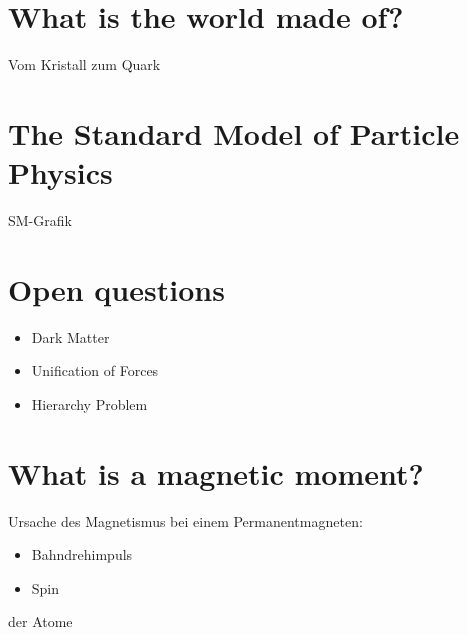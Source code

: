 \documentclass[12pt]{beamer}
\begin{document}

\section{What is the world made of?}

\begin{frame}{\insertsection}
  Vom Kristall zum Quark
\end{frame}


\section{The Standard Model of Particle Physics}

\begin{frame}{\insertsection}
  SM-Grafik
\end{frame}


\section{Open questions}

\begin{frame}{\insertsection}
  \begin{itemize}
  \item Dark Matter
  \item Unification of Forces
  \item Hierarchy Problem
  \end{itemize}
\end{frame}


\section{What is a magnetic moment?}

\begin{frame}{\insertsection}
  Ursache des Magnetismus bei einem Permanentmagneten:
  \begin{itemize}
  \item Bahndrehimpuls
  \item Spin
  \end{itemize}
  der Atome
\end{frame}
\end{document}
